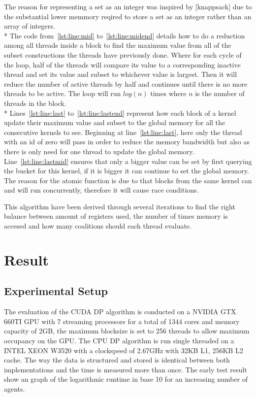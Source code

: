 \documentclass[a4paper, 12pt]{report}
\begin{document}
The reason for representing a set as an integer was inspired by [knappsack] due to the substantial lower memmory reqired to store a set as an integer rather than an array of integers.\\*
The code from~\ref{lst:line:mid} to~\ref{lst:line:midend} details how to do a reduction among all threads 
inside a block to find the maximum value from all of the subset constructions the threads have previously done.
Where for each cycle of the loop, half of the threads will compare its value to a corresponding inactive thread and set its value and subset to whichever value is largest.
Then it will reduce the number of active threads by half and continues until there is no more threads to be active.
The loop will run $log(n)$ times where $n$ is the number of threads in the block.\\* 
Lines~\ref{lst:line:last} to~\ref{lst:line:lastend} represent how each block of a kernel update their maximum value and subset to the global memory for all the consecutive kernels to see.
Beginning at line~\ref{lst:line:last}, here only the thread with an id of zero will pass in order to reduce the memory bandwidth but also as there is only need for one thread to update the global memory.
Line~\ref{lst:line:lastmid} ensures that only a bigger value can be set by first querying the bucket for this kernel, if it is bigger it can continue to set the global memory.
The reason for the atomic function is due to that blocks from the same kernel can and will run concurrently, therefore it will cause race conditions.

This algorithm have been derived through several iterations to find the right balance between amount of registers used, 
the number of times memory is accesed and how many coalitions should each thread evaluate. 
\section{Result}
\subsection{Experimental Setup}
The evaluation of the CUDA DP algorithm is conducted on a NVIDIA GTX 660TI GPU with 7 streaming processors
 for a total of 1344 cores and memory capacity of 2GB, the maximum blocksize is set to 256 threads to allow maximum occupancy on the GPU.
The CPU DP algorithm is run single threaded on a INTEL XEON W3520 with a clockspeed of 2.67GHz with 32KB L1, 256KB L2 cache.
The way the data is structured and stored is identical between both implementations and the time is measured more than once.
The early test result show an graph of the logarithmic runtime in base 10 for an increasing number of agents.
\end{document}
